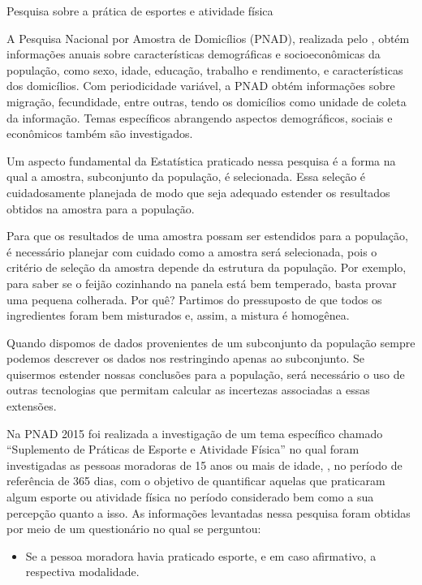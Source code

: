 \label{\detokenize{PE103-0:ativ-3-pesquisa-ibge-pnad}}
\begin{task}{ Pesquisa sobre a prática de esportes e atividade física}


A Pesquisa Nacional por Amostra de Domicílios (PNAD), realizada pelo , obtém informações anuais sobre características demográficas e socioeconômicas da população, como sexo, idade, educação, trabalho e rendimento, e características dos domicílios. Com periodicidade variável, a PNAD obtém informações sobre migração, fecundidade, entre outras, tendo os domicílios como unidade de coleta da informação. Temas específicos abrangendo aspectos demográficos, sociais e econômicos também são investigados.

Um aspecto fundamental da Estatística praticado nessa pesquisa é a forma na qual a amostra, subconjunto da população, é selecionada. Essa seleção é cuidadosamente planejada de modo que seja adequado estender os resultados obtidos na amostra para a população.

Para que os resultados de uma amostra possam ser estendidos para a população, é necessário planejar com cuidado como a amostra será selecionada, pois o critério de seleção da amostra depende da estrutura da população. Por exemplo, para saber se o feijão cozinhando na panela está bem temperado, basta provar uma pequena colherada. Por quê?  Partimos do pressuposto de que todos os ingredientes foram bem misturados e, assim, a mistura é homogênea.

Quando dispomos de dados provenientes de um subconjunto da população sempre podemos descrever os dados nos restringindo apenas ao subconjunto. Se quisermos estender nossas conclusões para a população, será necessário o uso de outras tecnologias que permitam calcular as incertezas associadas a essas extensões.

Na PNAD 2015 foi realizada a investigação de um tema específico chamado ``Suplemento de Práticas de Esporte e Atividade Física'' no qual foram investigadas as pessoas moradoras de 15 anos ou mais de idade, , no período de referência de 365 dias, com o objetivo de quantificar aquelas que praticaram algum esporte ou atividade física no período considerado bem como a sua percepção quanto a isso. As informações levantadas nessa pesquisa foram obtidas por meio de um questionário no qual se perguntou:
\begin{itemize}
\item {} 
Se a pessoa moradora havia praticado esporte, e em caso afirmativo, a respectiva modalidade.


\end{itemize}
\end{task}
